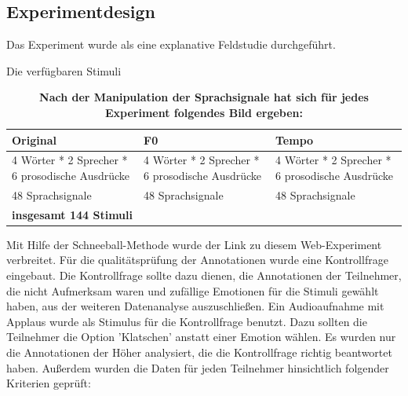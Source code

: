 \documentclass[11pt,a4paper,headsepline,twoside,toc=bibliography]{scrreprt}
\begin{document}
\subsection{Experimentdesign}
\label{sec:experiment_design}

Das Experiment wurde als eine explanative Feldstudie durchgeführt. 
\newline


Die verfügbaren Stimuli 

{
	\renewcommand{\arraystretch}{1.2}
	\begin{table}[!t]
		\centering
		
		\caption{\textbf{Nach der Manipulation der Sprachsignale hat sich für jedes Experiment folgendes Bild ergeben:}} \label{table:design}
		
		\begin{tabular}{@{}lll}
			
			\toprule
			
			\textbf{Original} & \textbf{F0} & \textbf{Tempo}\\
			
			\midrule
			
			4 Wörter * 2 Sprecher * 6 prosodische Ausdrücke & 
			4 Wörter * 2 Sprecher * 6 prosodische Ausdrücke & 4 Wörter * 2 Sprecher * 6 prosodische Ausdrücke\\
			
			\midrule
			
			48 Sprachsignale & 48 Sprachsignale & 48 Sprachsignale \\	
			
			\bottomrule
			
			\textbf{insgesamt 144 Stimuli} \\				
			
		\end{tabular}
		
	\end{table}
}

Mit Hilfe der Schneeball-Methode wurde der Link zu diesem Web-Experiment verbreitet. 
Für die qualitätsprüfung der Annotationen wurde eine Kontrollfrage eingebaut.
Die Kontrollfrage sollte dazu dienen, die Annotationen der Teilnehmer, die nicht Aufmerksam waren und zufällige Emotionen für die Stimuli gewählt haben, aus der weiteren Datenanalyse auszuschließen. Ein Audioaufnahme mit Applaus wurde als Stimulus für die Kontrollfrage benutzt. Dazu sollten die Teilnehmer die Option 'Klatschen' anstatt einer Emotion wählen. Es wurden nur die Annotationen der Höher analysiert, die die Kontrollfrage richtig beantwortet haben. Außerdem wurden die Daten für jeden Teilnehmer hinsichtlich folgender Kriterien geprüft: 
\end{document}

